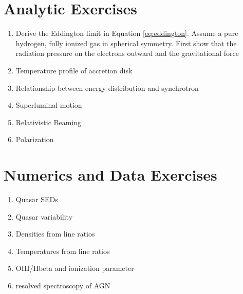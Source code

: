 \section{Analytic Exercises}

\begin{enumerate}
\item Derive the Eddington limit in
Equation \ref{eq:eddington}. Assume a pure hydrogen, fully ionized gas
in spherical symmetry.  First show that the radiation pressure on the
electrons outward and the gravitational force
\item Temperature profile of accretion disk
\item Relationship between energy distribution and synchrotron
\item Superluminal motion
\item Relativistic Beaming
\item Polarization
\end{enumerate}

\section{Numerics and Data Exercises}

\begin{enumerate}
\item Quasar SEDs
\item Quasar variability
\item Densities from line ratios
\item Temperatures from line ratios
\item OIII/Hbeta and ionization parameter
\item resolved spectroscopy of AGN
\end{enumerate}


  
 
